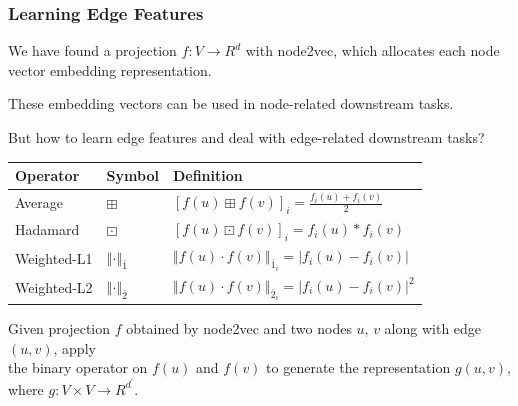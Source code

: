 \documentclass[10pt, aspectratio=169]{beamer}
\begin{document}
\begin{frame}
    \frametitle{Learning Edge Features}
    We have found a projection $f: V\rightarrow R^d$ with node2vec, which allocates each node vector embedding representation.\par \vspace{0.2cm}
    These embedding vectors can be used in node-related downstream tasks.\par \vspace{0.2cm}
    But how to learn edge features and deal with edge-related downstream tasks?\pause
    \begin{center}
        \begin{tabular}{lll}
            \toprule
            \textbf{Operator} & \textbf{Symbol} & \textbf{Definition}\\
            \midrule
            Average & $\boxplus$ & $\left[ f(u)\boxplus f(v) \right]_i = \frac{f_i(u) + f_i(v)}{2}$\\
            Hadamard & $\boxdot$ & $\left[ f(u)\boxdot f(v) \right]_i = f_i(u) \ast f_i(v) $\\
            Weighted-L1 & $\left\Vert \cdot \right\Vert_{\bar{1}}$ & $\left\Vert f(u) \cdot f(v) \right\Vert_{\bar{1}_i} = \left| f_i(u) - f_i(v) \right|$  \\ 
            Weighted-L2 & $\left\Vert \cdot \right\Vert_{\bar{2}}$ & $\left\Vert f(u) \cdot f(v) \right\Vert_{\bar{2}_i} = \left| f_i(u) - f_i(v) \right|^2$\\
            \bottomrule
        \end{tabular}
    \end{center}
    Given projection $f$ obtained by node2vec and two nodes $u$, $v$ along with edge $(u,v)$, apply \\ the binary operator on $f(u)$ and $f(v)$ to generate the representation $g(u,v)$, where $g: V\times V\rightarrow R^{d^{'}}$.
\end{frame}
\end{document}

